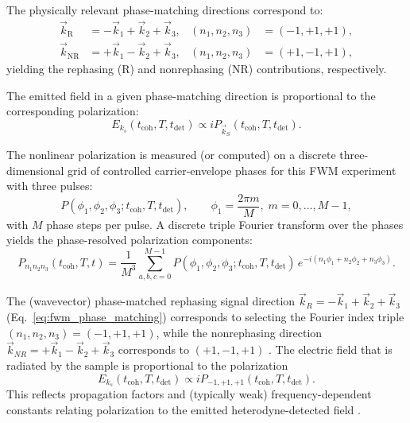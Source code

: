 \noindent The physically relevant phase-matching directions correspond to:
\begin{align}
	\vec{k}_{\mathrm{R}}  & = -\vec{k}_1 + \vec{k}_2 + \vec{k}_3,
	                      & (n_1,n_2,n_3)                         & = (-1,+1,+1), \label{eq:rephasing_selection}    \\
	\vec{k}_{\mathrm{NR}} & = +\vec{k}_1 - \vec{k}_2 + \vec{k}_3,
	                      & (n_1,n_2,n_3)                         & = (+1,-1,+1), \label{eq:nonrephasing_selection}
\end{align}
yielding the rephasing (R) and nonrephasing (NR) contributions, respectively.

\noindent The emitted field in a given phase-matching direction is proportional to the corresponding polarization:
\begin{equation}
	E_{k_s}(t_{\text{coh}},T,t_{\text{det}}) \propto i P_{\vec{k}_S}(t_{\text{coh}},T,t_{\text{det}}).
	\label{eq:field_polarization_relation}
\end{equation}

\noindent The nonlinear polarization is measured (or computed) on a discrete three-dimensional grid of controlled carrier-envelope phases for this FWM experiment with three pulses:
\begin{equation}
	P(\phi_{1}, \phi_{2}, \phi_{3}; t_{\text{coh}}, T, t_{\text{det}}), \qquad
	\phi_{1} = \frac{2\pi m}{M}, \; m=0,\dots,M-1,
	\label{eq:phase_grid_definition}
\end{equation}
with $M$ phase steps per pulse. A discrete triple Fourier transform over the phases yields the phase-resolved polarization components:
\begin{equation}
	P_{n_1 n_2 n_3}(t_{\text{coh}}, T, t)
	=
	\frac{1}{M^{3}}
	\sum_{a,b,c=0}^{M-1}
	P(\phi_{1}, \phi_{2}, \phi_{3}; t_{\text{coh}}, T, t_{\text{det}})\,
	e^{-i ( n_1 \phi_{1} + n_2 \phi_{2} + n_3 \phi_{3} )}.
	\label{eq:dft_phase_cycling}
\end{equation}

\noindent The (wavevector) phase-matched rephasing signal direction $\vec{k}_R = -\vec{k}_1 + \vec{k}_2 + \vec{k}_3$ (Eq.~\eqref{eq:fwm_phase_matching}) corresponds to selecting the Fourier index triple $(n_1,n_2,n_3)=(-1,+1,+1)$, while the nonrephasing direction $\vec{k}_{NR} = +\vec{k}_1 - \vec{k}_2 + \vec{k}_3$ corresponds to $(+1,-1,+1)$ \cite{mukamel1995principlesnonlinearoptical, cho2009twodimensionalopticalspectroscopy, greenetal2024vibrationalcoherenceshalfbroadband}. The electric field that is radiated by the sample is proportional to the polarization
\begin{equation}
	E_{k_s}(t_{\text{coh}}, T, t_{\text{det}}) \propto i P_{-1,+1,+1}(t_{\text{coh}}, T, t_{\text{det}}).
\end{equation}
This reflects propagation factors and (typically weak) frequency-dependent constants relating polarization to the emitted heterodyne-detected field \cite{mukamel1995principlesnonlinearoptical, greenetal2024vibrationalcoherenceshalfbroadband}.

